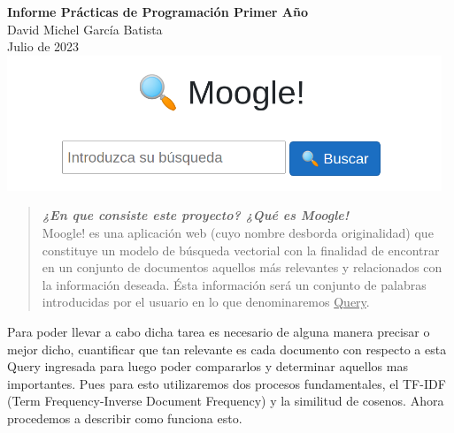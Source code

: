 \documentclass[12pt, Letterpaper]{article}
\begin{document}
\begin{center}
\Huge\textbf{Informe Prácticas de Programación Primer Año}
\vspace{0.5em}\\
\large{David Michel García Batista}\\
\small{Julio de 2023}
        \includegraphics[width=13cm]{moogle-1.png}
        \end{center}
\begin{abstract}
    \textbf{\textit{¿En que consiste este proyecto? ¿Qué es Moogle!}}\\
Moogle! es una aplicación web (cuyo nombre desborda originalidad) que constituye un modelo de búsqueda vectorial con
la finalidad de encontrar en un conjunto de documentos aquellos más relevantes y relacionados con la información
deseada. Ésta información será un conjunto de palabras introducidas por el usuario en lo que
denominaremos \underline{Query}.
\end{abstract}

\newpage
Para poder llevar a cabo dicha tarea es necesario de alguna manera precisar o mejor dicho, cuantificar que tan 
relevante es cada documento con respecto a esta Query ingresada para luego poder compararlos y determinar aquellos
mas importantes. Pues para esto utilizaremos dos procesos fundamentales, el TF-IDF (Term Frequency-Inverse Document 
Frequency) y la similitud de cosenos. Ahora procedemos a describir como funciona esto.\\
\end{document}
